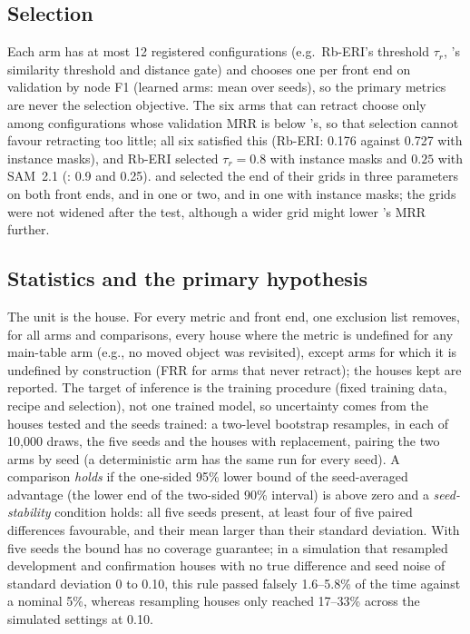 \subsection{Selection}
Each arm has at most 12 registered configurations (e.g.\ Rb-ERI's threshold $\tau_r$, 's similarity threshold and distance gate) and chooses one per front end on validation by node F1 (learned arms: mean over seeds), so the primary metrics are never the selection objective.
The six arms that can retract choose only among configurations whose validation MRR is below 's, so that selection cannot favour retracting too little; all six satisfied this (Rb-ERI: 0.176 against 0.727 with instance masks), and Rb-ERI selected $\tau_r=0.8$ with instance masks and $0.25$ with SAM~2.1 (: 0.9 and 0.25).
 and  selected the end of their grids in three parameters on both front ends,  and  in one or two, and  in one with instance masks; the grids were not widened after the test, although a wider grid might lower 's MRR further.

\subsection{Statistics and the primary hypothesis}
\label{sec:stats}
The unit is the house.
For every metric and front end, one exclusion list removes, for all arms and comparisons, every house where the metric is undefined for any main-table arm (e.g., no moved object was revisited), except arms for which it is undefined by construction (FRR for arms that never retract); the houses kept are reported.
The target of inference is the training procedure (fixed training data, recipe and selection), not one trained model, so uncertainty comes from the houses tested and the seeds trained: a two-level bootstrap resamples, in each of 10,000 draws, the five seeds and the houses with replacement, pairing the two arms by seed (a deterministic arm has the same run for every seed).
A comparison \emph{holds} if the one-sided 95\% lower bound of the seed-averaged advantage (the lower end of the two-sided 90\% interval) is above zero and a \emph{seed-stability} condition holds: all five seeds present, at least four of five paired differences favourable, and their mean larger than their standard deviation.
With five seeds the bound has no coverage guarantee; in a simulation that resampled development and confirmation houses with no true difference and seed noise of standard deviation 0 to 0.10, this rule passed falsely 1.6--5.8\% of the time against a nominal 5\%, whereas resampling houses only reached 17--33\% across the simulated settings at 0.10.

